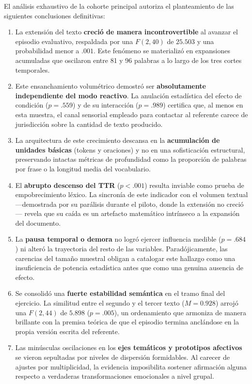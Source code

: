 \documentclass[12pt]{article}
\begin{document}
	El análisis exhaustivo de la cohorte principal autoriza el planteamiento de las siguientes conclusiones definitivas:
	
	\begin{enumerate}
		\item La extensión del texto \textbf{creció de manera incontrovertible} al avanzar el episodio evaluativo, respaldada por una $F(2,40)$ de $25.503$ y una probabilidad menor a $.001$. Este fenómeno se materializó en expansiones acumuladas que oscilaron entre 81 y 96 palabras a lo largo de los tres cortes temporales.
		\item Este ensanchamiento volumétrico demostró ser \textbf{absolutamente independiente del modo reactivo}. La anulación estadística del efecto de condición ($p = .559$) y de su interacción ($p = .989$) certifica que, al menos en esta muestra, el canal sensorial empleado para contactar al referente carece de jurisdicción sobre la cantidad de texto producido.
		\item La arquitectura de este crecimiento descansa en la \textbf{acumulación de unidades básicas} (tokens y oraciones) y no en una sofisticación estructural, preservando intactas métricas de profundidad como la proporción de palabras por frase o la longitud media del vocabulario.
		\item El \textbf{abrupto descenso del TTR} ($p < .001$) resulta inviable como prueba de empobrecimiento léxico. La sincronía de este indicador con el volumen textual —demostrada por su parálisis durante el piloto, donde la extensión no creció— revela que su caída es un artefacto matemático intrínseco a la expansión del documento.
		\item La \textbf{pausa temporal o demora} no logró ejercer influencia medible ($p = .684$) ni alteró la trayectoria del resto de las variables. Paradójicamente, las carencias del tamaño muestral obligan a catalogar este hallazgo como una insuficiencia de potencia estadística antes que como una genuina ausencia de efecto.
		\item Se consolidó una \textbf{fuerte estabilidad semántica} en el tramo final del ejercicio. La similitud entre el segundo y el tercer texto ($M = 0.928$) arrojó una $F(2,44)$ de $5.898$ ($p = .005$), un ordenamiento que armoniza de manera brillante con la premisa teórica de que el episodio termina anclándose en la propia versión escrita del referente.
		\item Las minúsculas oscilaciones en los \textbf{ejes temáticos y prototipos afectivos} se vieron sepultadas por niveles de dispersión formidables. Al carecer de ajustes por multiplicidad, la evidencia imposibilita sostener afirmación alguna respecto a verdaderas transformaciones emocionales a nivel grupal.

\end{enumerate}
\end{document}
